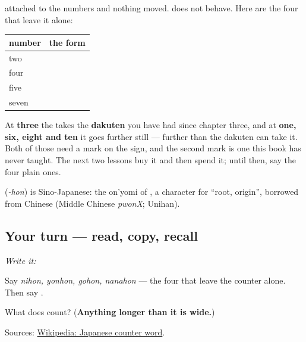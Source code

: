 \begin{grammarlens}[title={Grammar Lens — the counter bends the sound}]
\textbf{} attached to the numbers and nothing moved. \textbf{} does not behave. Here are the four that leave it alone:

\noindent
\begin{tabularx}{\linewidth}{@{}>{\raggedright\arraybackslash}X>{\raggedright\arraybackslash}X@{}}
\toprule
\textbf{number} & \textbf{the form} \\
\midrule
two & \textbf{\ja{にほん}} \\
four & \textbf{\ja{よんほん}} \\
five & \textbf{\ja{ごほん}} \\
seven & \textbf{\ja{ななほん}} \\
\bottomrule
\end{tabularx}

At \textbf{three} the \textbf{} takes the \textbf{dakuten} you have had since chapter three, and at \textbf{one, six, eight and ten} it goes further still — further than the dakuten can take it. Both of those need a mark on the sign, and the second mark is one this book has never taught. The next two lessons buy it and then spend it; until then, say the four plain ones.
\end{grammarlens}

\begin{cousinweb}
\textbf{} (\emph{-hon}) is Sino-Japanese: the on'yomi of \textbf{}, a character for \textquotedblleft{}root, origin\textquotedblright{}, borrowed from Chinese (Middle Chinese \emph{pwonX}; Unihan).
\end{cousinweb}

\subsection*{Your turn — read, copy, recall}
\emph{Write it:} \textbf{}

Say \emph{nihon, yonhon, gohon, nanahon} — the four that leave the counter alone. Then say \textbf{ }.

\begin{tcolorbox}[breakable,colback=teal!4,colframe=teal!35!black,title={Before you move on}]
What does \textbf{} count? (\textbf{Anything longer than it is wide.})

Sources: \href{https://en.wikipedia.org/wiki/Japanese\_counter\_word}{Wikipedia: Japanese counter word}.
\end{tcolorbox}
